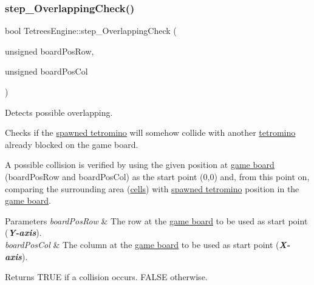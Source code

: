 \subsubsection{\texorpdfstring{step\+\_\+\+Overlapping\+Check()}{step\_OverlappingCheck()}}
{\footnotesize\ttfamily bool Tetrees\+Engine\+::step\+\_\+\+Overlapping\+Check (\begin{DoxyParamCaption}\item[{unsigned}]{board\+Pos\+Row,  }\item[{unsigned}]{board\+Pos\+Col }\end{DoxyParamCaption})\hspace{0.3cm}{\ttfamily [private]}}



Detects possible overlapping. 

Checks if the \hyperlink{classTetreesEngine_a26435ee2f02d9ba70d9e359745114f6e}{spawned tetromino} will somehow collide with another \hyperlink{TetreesDefs_8hpp_adf4f8e2cbbd7d8894fe3beda39db1b8f}{tetromino} already blocked on the game board.

A possible collision is verified by using the given position at \hyperlink{classTetreesEngine_a37d082a7816d6731b2703dd6d1a1cb97}{game board} (board\+Pos\+Row and board\+Pos\+Col) as the start point (0,0) and, from this point on, comparing the surrounding area (\hyperlink{TetreesDefs_8hpp_a7c8699d7ca48189b748ba8f94eb9d515}{cells}) with \hyperlink{classTetreesEngine_a26435ee2f02d9ba70d9e359745114f6e}{spawned tetromino} position in the \hyperlink{classTetreesEngine_a37d082a7816d6731b2703dd6d1a1cb97}{game board}. 
\begin{DoxyParams}{Parameters}
{\em board\+Pos\+Row} & The row at the \hyperlink{classTetreesEngine_a37d082a7816d6731b2703dd6d1a1cb97}{game board} to be used as start point ({\itshape {\bfseries Y-\/axis}}). \\
\hline
{\em board\+Pos\+Col} & The column at the \hyperlink{classTetreesEngine_a37d082a7816d6731b2703dd6d1a1cb97}{game board} to be used as start point ({\itshape {\bfseries X-\/axis}}). \\
\hline
\end{DoxyParams}
\begin{DoxyReturn}{Returns}
{\ttfamily T\+R\+UE} if a collision occurs. {\ttfamily F\+A\+L\+SE} otherwise. 
\end{DoxyReturn}
\mbox{\label{classTetreesEngine_a626d60fa8adb2dd024016b5cfed4f6ee}} 
